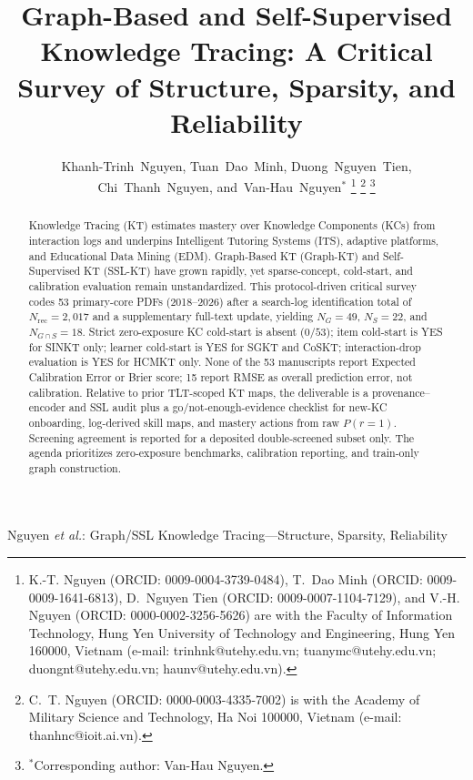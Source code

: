 \documentclass[lettersize,journal]{IEEEtran}
\begin{document}
\title{Graph-Based and Self-Supervised Knowledge Tracing: A Critical Survey of Structure, Sparsity, and Reliability}
\author{Khanh-Trinh~Nguyen,
        Tuan~Dao~Minh,
        Duong~Nguyen~Tien,
        Chi~Thanh~Nguyen,
        and~Van-Hau~Nguyen$^{*}$%
\thanks{K.-T. Nguyen (ORCID: 0009-0004-3739-0484),
T.~Dao Minh (ORCID: 0009-0009-1641-6813),
D.~Nguyen Tien (ORCID: 0009-0007-1104-7129),
and V.-H. Nguyen (ORCID: 0000-0002-3256-5626)
are with the Faculty of Information Technology,
Hung Yen University of Technology and Engineering, Hung Yen 160000, Vietnam
(e-mail: trinhnk@utehy.edu.vn; tuanymc@utehy.edu.vn;
duongnt@utehy.edu.vn; haunv@utehy.edu.vn).}%
\thanks{C.~T. Nguyen (ORCID: 0000-0003-4335-7002)
is with the Academy of Military Science and Technology, Ha Noi 100000, Vietnam
(e-mail: thanhnc@ioit.ai.vn).}%
\thanks{$^{*}$Corresponding author: Van-Hau Nguyen.}%
}
%
{Nguyen \MakeLowercase{\textit{et al.}}: Graph/SSL Knowledge Tracing---Structure, Sparsity, Reliability}

\maketitle

\begin{abstract}
Knowledge Tracing (KT) estimates mastery over Knowledge Components (KCs) from interaction logs and underpins Intelligent Tutoring Systems (ITS), adaptive platforms, and Educational Data Mining (EDM). Graph-Based KT (Graph-KT) and Self-Supervised KT (SSL-KT) have grown rapidly, yet sparse-concept, cold-start, and calibration evaluation remain unstandardized. This protocol-driven critical survey codes 53 primary-core PDFs (2018--2026) after a search-log identification total of $N_{\mathrm{rec}}=2{,}017$ and a supplementary full-text update, yielding $N_G=49$, $N_S=22$, and $N_{G\cap S}=18$. Strict zero-exposure KC cold-start is absent ($0/53$); item cold-start is YES for SINKT only; learner cold-start is YES for SGKT and CoSKT; interaction-drop evaluation is YES for HCMKT only. None of the 53 manuscripts report Expected Calibration Error or Brier score; 15 report RMSE as overall prediction error, not calibration. Relative to prior TLT-scoped KT maps, the deliverable is a provenance--encoder and SSL audit plus a go/not-enough-evidence checklist for new-KC onboarding, log-derived skill maps, and mastery actions from raw $P(r=1)$. Screening agreement is reported for a deposited double-screened subset only. The agenda prioritizes zero-exposure benchmarks, calibration reporting, and train-only graph construction.
\end{abstract}
\end{document}
